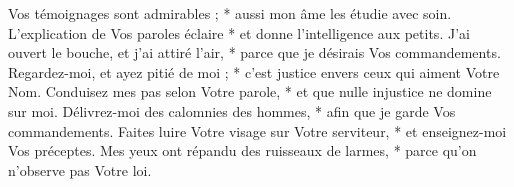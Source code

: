 Vos témoignages sont admirables ; * aussi mon âme les étudie avec soin.
\versseparator
L'explication de Vos paroles éclaire * et donne l'intelligence aux petits.
\versseparator
J'ai ouvert le bouche, et j'ai attiré l'air, * parce que je désirais Vos commandements.
\versseparator
Regardez-moi, et ayez pitié de moi ; * c'est justice envers ceux qui aiment Votre Nom.
\versseparator
Conduisez mes pas selon Votre parole, * et que nulle injustice ne domine sur moi.
\versseparator
Délivrez-moi des calomnies des hommes, * afin que je garde Vos commandements.
\versseparator
Faites luire Votre visage sur Votre serviteur, * et enseignez-moi Vos préceptes.
\versseparator
Mes yeux ont répandu des ruisseaux de larmes, * parce qu'on n'observe pas Votre loi.